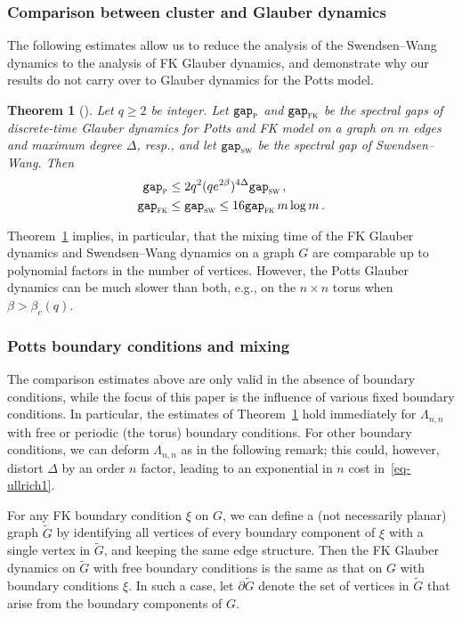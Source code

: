 \documentclass[reqno,11pt]{amsart}
\numberwithin{equation}{section}
\newtheorem{theorem}{Theorem}[section]
\theoremstyle{definition}{
\newtheorem{example}[theorem]{Example}
\newtheorem{definition}[theorem]{Definition}
\newtheorem*{definition*}{Definition}
\newtheorem{problem}[theorem]{Problem}
\newtheorem{question}[theorem]{Question}
\newtheorem{remark}[theorem]{Remark}
}
\newcommand{\gap}{\text{\tt{gap}}}
\newcommand{\rc}{{\textsc{fk}}}
\begin{document}
\subsubsection*{Comparison between cluster and Glauber dynamics}
The following  estimates allow us to reduce the analysis of the Swendsen--Wang dynamics to the analysis of FK Glauber dynamics, and demonstrate why our results do not carry over to  Glauber dynamics for the Potts model.

\begin{theorem}[\cite{Ul13,Ul14}]\label{thm:Ullrich-comparison}
Let $q \geq 2$ be integer.
Let $\gap_{\textsc p}$ and $\gap_{\rc}$ be the spectral gaps of discrete-time Glauber dynamics for Potts and FK model on a graph on $m$ edges and maximum degree $\Delta$, resp., and let $\gap_{\textsc {sw}}$
be the
spectral gap of Swendsen--Wang.
Then
\begin{align}
\gap_{\textsc p} &\leq  2q^2 (qe^{2\beta})^{4\Delta}\gap_{\textsc {sw}}\,,\label{eq-ullrich1}\\
\gap_{\rc} &\leq\gap_{\textsc {sw}}\leq 16 \gap_{\rc}\, m\log m \,.\label{eq-ullrich2}
\end{align}
\end{theorem}

Theorem~\ref{thm:Ullrich-comparison} implies, in particular, that the mixing time of the FK Glauber dynamics and Swendsen--Wang dynamics on a graph $G$ are comparable up to polynomial factors in the number of vertices.  However, the Potts Glauber dynamics can be much slower than both, e.g., on the $n\times n$ torus when $\beta>\beta_c(q)$.  

\subsubsection*{Potts boundary conditions and mixing}
The comparison estimates above are only valid in the absence of boundary conditions, while the focus of this paper is the influence of various fixed boundary conditions.
In particular, the estimates of Theorem~\ref{thm:Ullrich-comparison} hold immediately for $\Lambda_{n,n}$ with free or periodic (the torus) boundary conditions. For other boundary conditions, we can deform $\Lambda_{n,n}$ as in the following remark; this could, however, distort $\Delta$ by an order $n$ factor, leading to an exponential in $n$ cost in~\eqref{eq-ullrich1}.

\begin{remark}\label{rem:bc-deform}
For any FK boundary condition $\xi$ on $G$, we can define a (not necessarily planar) graph $\tilde G$ by identifying all vertices of every boundary component of $\xi$ with a single vertex in $\tilde G$, and keeping the same edge structure. Then the FK Glauber dynamics on $\tilde G$ with free boundary conditions is the same as that on $G$ with boundary conditions $\xi$. In such a case, let $\partial \tilde G$ denote the set of vertices in $\tilde G$ that arise from the boundary components of $G$.
\end{remark}
\end{document}
